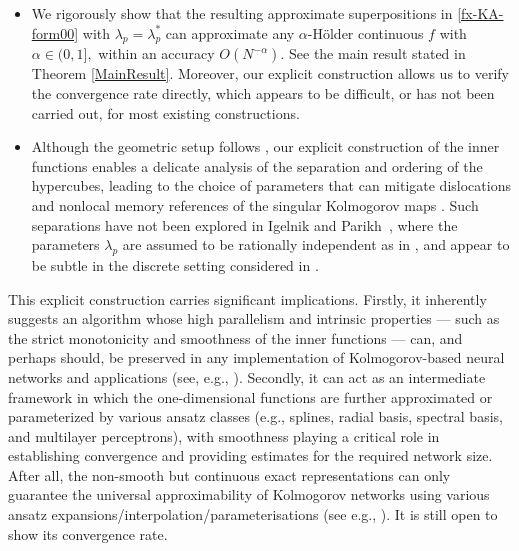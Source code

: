 \documentclass[10pt,reqno,final]{amsart}
\theoremstyle{remark}
\theoremstyle{definition}
\newcommand{\bs}[1]{\boldsymbol{#1}}
\newcommand{\wll}[1]{#1}
\begin{document}
\begin{itemize}
\smallskip
\item[(iii)]  We rigorously show that the resulting approximate superpositions in \eqref{fx-KA-form00}
with $\lambda_p=\lambda_p^*$ 
can approximate any $\alpha$-H\"older continuous $f$ with $\alpha\in (0,1],$ within an accuracy $O(N^{-\alpha}).$ See the main result stated in Theorem 
\ref{MainResult}. \wll{Moreover, our explicit construction allows us to verify the convergence rate directly, which appears to be difficult, or has not been carried out, for most existing constructions.}
\smallskip 
\item[(iv)] \wll{Although the geometric setup follows \cite{Kahane1975,Igelnik2003}, our explicit construction of the inner functions enables a delicate analysis of the separation and ordering of the hypercubes, leading to the choice of parameters that can mitigate dislocations and nonlocal memory references of the singular Kolmogorov maps  \cite{Sprecher2017algebra,Demb2021note}. Such separations have not been explored in Igelnik and Parikh~\cite{Igelnik2003}, where the parameters $\lambda_p$ are assumed to be rationally independent as in \cite{Kahane1975}, and appear to be subtle in the discrete setting considered in \cite{Sprecher2017algebra,Demb2021note}.}
\end{itemize}
\smallskip



This explicit construction carries significant implications. Firstly, it inherently suggests an algorithm whose high parallelism and intrinsic properties — such as the strict monotonicity and smoothness of the inner functions — can, and perhaps should, be preserved in any implementation of Kolmogorov-based neural networks and applications (see, e.g., \cite{Leni2014Progressive,Montanelli2020error,He2024}).   
Secondly, it can act as an intermediate framework in which the one-dimensional functions are further approximated or parameterized by various ansatz classes (e.g., splines, radial basis, spectral basis, and multilayer perceptrons), with smoothness playing a critical role in establishing convergence and providing estimates for the required network size. After all, the non-smooth but continuous exact representations can only guarantee the universal approximability of Kolmogorov networks using various ansatz expansions/interpolation/parameterisations (see e.g., \cite{Kourkova1991,Kuurkova1992kolmogorov,Toscano2024kkans,PetersenZech2024}).  It is still open to show its convergence rate.           
\end{document}
